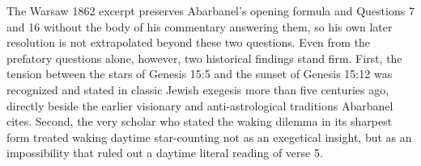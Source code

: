 The Warsaw 1862 excerpt preserves Abarbanel's opening formula and Questions 7 and 16 without the body of his commentary answering them, so his own later resolution is not extrapolated beyond these two questions. Even from the prefatory questions alone, however, two historical findings stand firm. First, the tension between the stars of Genesis 15:5 and the sunset of Genesis 15:12 was recognized and stated in classic Jewish exegesis more than five centuries ago, directly beside the earlier visionary and anti-astrological traditions Abarbanel cites. Second, the very scholar who stated the waking dilemma in its sharpest form treated waking daytime star-counting not as an exegetical insight, but as an impossibility that ruled out a daytime literal reading of verse 5.
